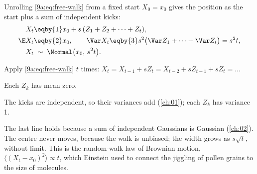 Unrolling \eqref{9a:eq:free-walk} from a fixed start $X_0=x_0$ gives the position as the start
plus a sum of independent kicks:
\begin{align}
  X_t
  &\eqby{1}x_0+s\,(Z_1+Z_2+\dots+Z_t),
  \nonumber\\
  \E X_t&\eqby{2}x_0,
  \qquad
  \Var X_t\eqby{3}s^2\bigl(\Var Z_1+\dots+\Var Z_t\bigr)=s^2t,
  \nonumber\\
  X_t&\;\sim\;\Normal\bigl(x_0,\,s^2t\bigr).
  \label{9a:eq:free-spread}
\end{align}
\begin{explain}
  \item Apply \eqref{9a:eq:free-walk} $t$ times: $X_t=X_{t-1}+sZ_t=X_{t-2}+sZ_{t-1}+sZ_t=\dots$
  \item Each $Z_k$ has mean zero.
  \item The kicks are independent, so their variances add (\cref{ch:01}); each $Z_k$ has
        variance 1.
\end{explain}
The last line holds because a sum of independent Gaussians is Gaussian (\cref{ch:02}). The
centre never moves, because the walk is unbiased; the width grows as $s\sqrt t$, without limit.
This is the random-walk law of Brownian motion, $\langle(X_t-x_0)^2\rangle\propto t$, which
Einstein used to connect the jiggling of pollen grains to the size of molecules.

